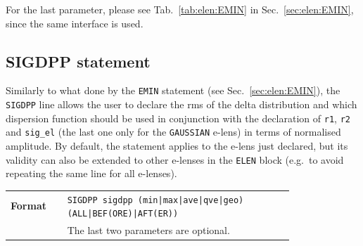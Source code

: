\bigskip
\noindent For the last parameter, please see Tab.~\ref{tab:elen:EMIN} in Sec.~\ref{sec:elen:EMIN}, since the same interface is used.

\subsection{SIGDPP statement}\label{sec:elen:SIGDPP}
Similarly to what done by the \texttt{EMIN} statement (see Sec.~\ref{sec:elen:EMIN}), the \texttt{SIGDPP} line allows the user to declare the rms of the delta distribution and which dispersion function should be used in conjunction with the declaration of \texttt{r1}, \texttt{r2} and \texttt{sig\_el} (the last one only for the \texttt{GAUSSIAN} e-lens) in terms of normalised amplitude. By default, the statement applies to the e-lens just declared, but its validity can also be extended to other e-lenses in the \texttt{ELEN} block (e.g.~to avoid repeating the same line for all e-lenses).

\bigskip
\begin{tabular}{@{}lp{0.8\linewidth}}
    \textbf{Format}     & \texttt{SIGDPP sigdpp (min|max|ave|qve|geo) (ALL|BEF(ORE)|AFT(ER))} \\
    & The last two parameters are optional.  \\
\end{tabular}


